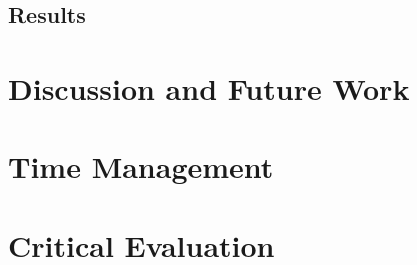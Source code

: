 \documentclass[12pt,a4paper,titlepage]{article}
\begin{document}
\subsection{Results}




%







\section{Discussion and Future Work}

\newpage

\appendix
\section{Time Management}
\section{Critical Evaluation}
\end{document}
